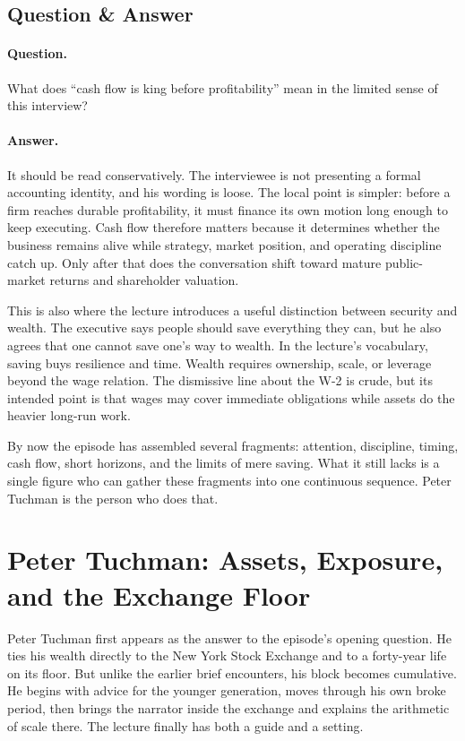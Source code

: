 \subsection{Question \& Answer}

\paragraph{Question.} What does ``cash flow is king before profitability'' mean in the limited sense of this interview?

\paragraph{Answer.} It should be read conservatively. The interviewee is not presenting a formal accounting identity, and his wording is loose. The local point is simpler: before a firm reaches durable profitability, it must finance its own motion long enough to keep executing. Cash flow therefore matters because it determines whether the business remains alive while strategy, market position, and operating discipline catch up. Only after that does the conversation shift toward mature public-market returns and shareholder valuation.

This is also where the lecture introduces a useful distinction between security and wealth. The executive says people should save everything they can, but he also agrees that one cannot save one's way to wealth. In the lecture's vocabulary, saving buys resilience and time. Wealth requires ownership, scale, or leverage beyond the wage relation. The dismissive line about the W-2 is crude, but its intended point is that wages may cover immediate obligations while assets do the heavier long-run work.

By now the episode has assembled several fragments: attention, discipline, timing, cash flow, short horizons, and the limits of mere saving. What it still lacks is a single figure who can gather these fragments into one continuous sequence. Peter Tuchman is the person who does that.

\section{Peter Tuchman: Assets, Exposure, and the Exchange Floor}

Peter Tuchman first appears as the answer to the episode's opening question. He ties his wealth directly to the New York Stock Exchange and to a forty-year life on its floor. But unlike the earlier brief encounters, his block becomes cumulative. He begins with advice for the younger generation, moves through his own broke period, then brings the narrator inside the exchange and explains the arithmetic of scale there. The lecture finally has both a guide and a setting.

